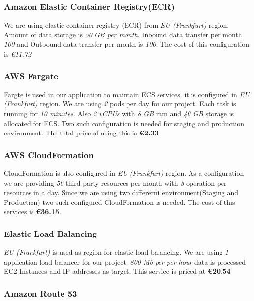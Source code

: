 \subsubsection{Amazon Elastic Container Registry(ECR)}

We are using elastic container registry (ECR) from \textit{EU (Frankfurt)} region. Amount of data storage is \textit{50 GB per month}. Inbound data transfer per month \textit{100} and Outbound data transfer per month is \textit{100}. The cost of this configuration is \textit{€11.72}

\subsubsection{AWS Fargate}

Fargte is used in our application to maintain ECS services. it is configured in \textit{EU (Frankfurt)} region. We are using \textit{2} pods per day for our project. Each task is running for \textit{10 minutes}. Also \textit{2 vCPUs} with \textit{8 GB} ram and \textit{40 GB} storage is allocated for ECS. Two such configuration is needed for staging and production environment. The total price of using this is \textbf{€2.33}.

\subsubsection{AWS CloudFormation}

CloudFormation is also configured in \textit{EU (Frankfurt)} region. As a configuration we are providing \textit{50} third party resources per month with \textit{8} operation per resources in a day. Since we are using two differernt environment(Staging and Production) two such configured CloudFormation is needed. The cost of this services is \textbf{€36.15}.

\subsubsection{Elastic Load Balancing}

\textit{EU (Frankfurt)} is used as region for elastic load balancing. We are using \textit{1} application load balancer for our project. \textit{800 Mb per per hour} data is processed EC2 Instances and IP addresses as target. This service is priced at \textbf{€20.54}

\subsubsection{Amazon Route 53}

